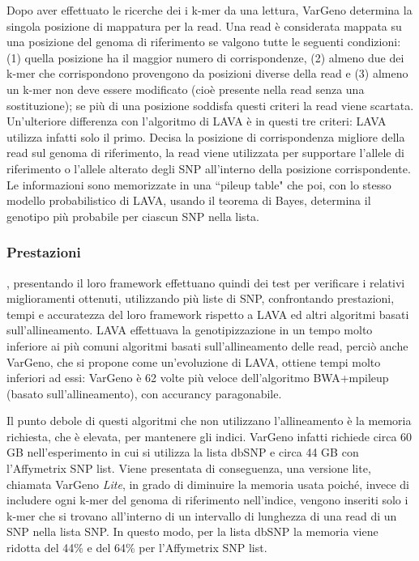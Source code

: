 \documentclass[../main.tex]{subfiles}
\begin{document}
Dopo aver effettuato le ricerche dei i k-mer da una lettura, VarGeno determina la singola posizione di mappatura per la read. Una read è considerata mappata su una posizione del genoma di riferimento se valgono tutte le seguenti condizioni: (1) quella posizione ha il maggior numero di corrispondenze, (2) almeno due dei k-mer che corrispondono provengono da posizioni diverse della read e (3) almeno un k-mer non deve essere modificato (cioè presente nella read senza una sostituzione); se più di una posizione soddisfa questi criteri la read viene scartata. Un'ulteriore differenza con l'algoritmo di LAVA è in questi tre criteri: LAVA utilizza infatti solo il primo. Decisa la posizione di corrispondenza migliore della read sul genoma di riferimento, la read viene utilizzata per supportare l'allele di riferimento o l'allele alterato degli SNP all'interno della posizione corrispondente. Le informazioni sono memorizzate in una ``pileup table" che poi, con lo stesso modello probabilistico di LAVA, usando il teorema di Bayes, determina il genotipo più probabile per ciascun SNP nella lista.

\subsubsection{Prestazioni}
\cite{sun-medvedev2018vargeno}, presentando il loro framework effettuano quindi dei test per verificare i relativi miglioramenti ottenuti, utilizzando più liste di SNP, confrontando prestazioni, tempi e accuratezza del loro framework rispetto a LAVA ed altri algoritmi basati sull'allineamento. LAVA effettuava la genotipizzazione in un tempo molto inferiore ai più comuni algoritmi basati sull'allineamento delle read, perciò anche VarGeno, che si propone come un'evoluzione di LAVA, ottiene tempi molto inferiori ad essi: VarGeno è 62 volte più veloce dell'algoritmo BWA+mpileup (basato sull'allineamento), con accurancy paragonabile. 

Il punto debole di questi algoritmi che non utilizzano l'allineamento è la memoria richiesta, che è elevata, per mantenere gli indici. VarGeno infatti richiede circa 60 GB nell'esperimento in cui si utilizza la lista dbSNP e circa 44 GB con l'Affymetrix SNP list. Viene presentata di conseguenza, una versione lite, chiamata VarGeno \textit{Lite}, in grado di diminuire la memoria usata poiché, invece di includere ogni k-mer del genoma di riferimento nell'indice, vengono inseriti solo i k-mer che si trovano all'interno di un intervallo di lunghezza di una read di un SNP nella lista SNP. In questo modo, per la lista dbSNP la memoria viene ridotta del 44\% e del 64\% per l'Affymetrix SNP list.\\
\end{document}
